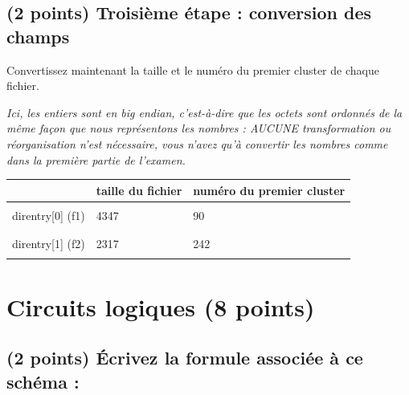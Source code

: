 \documentclass[11pt,a4paper]{article}
\begin{document}
\vspace*{-0.25cm}


\subsection{(2 points) Troisième étape : conversion des champs }

\noindent Convertissez maintenant la taille et le numéro du premier cluster de chaque fichier.

\smallskip

\noindent \textit{Ici, les entiers sont en big endian, c'est-à-dire que les octets sont ordonnés de la même façon que nous représentons les nombres : AUCUNE transformation ou réorganisation n'est nécessaire, vous n'avez qu'à convertir les nombres comme dans la première partie de l'examen.}

\smallskip

\begin{center}
\begin{tabular}{ | c | C{5cm} | C{7.5cm} | }
\hline
 & taille du fichier & numéro du premier cluster \\
\hline
 & & \\
direntry[0] (f1) &  4347  &  90 \\
 & & \\
\hline
 & & \\
direntry[1] (f2) &  2317  &  242 \\
 & & \\
\hline
\end{tabular}
\end{center}


\clearpage



\section{Circuits logiques (8 points)}

\subsection{(2 points) \'Ecrivez la formule associée à ce schéma : }

\smallskip

\begin{figure}[ht!]
\end{figure}
\end{document}
